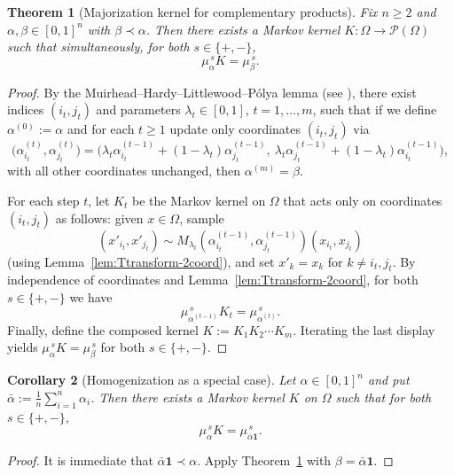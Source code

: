 \documentclass[11pt]{amsart}
\theoremstyle{plain}
\newtheorem{theorem}{Theorem}[section]
\newtheorem{corollary}[theorem]{Corollary}
\theoremstyle{definition}
\begin{document}
\begin{appendix}
\begin{theorem}[Majorization kernel for complementary products]
\label{thm:majorization-kernel}
Fix $n\ge2$ and $\alpha,\beta\in[0,1]^n$ with $\beta\prec\alpha$.
Then there exists a Markov kernel $K:\Omega\to\mathcal P(\Omega)$ such that
simultaneously, for both $s\in\{+,-\}$,
\[
\mu_{\alpha}^{\,s}K=\mu_{\beta}^{\,s}.
\]
\end{theorem}

\begin{proof}
By the Muirhead--Hardy--Littlewood--P\'olya lemma
(see \cite[Lemma~B.1]{marshall2011inequalities}),
there exist indices $(i_t,j_t)$ and parameters $\lambda_t\in[0,1]$, $t=1,\dots,m$,
such that if we define $\alpha^{(0)}:=\alpha$ and for each $t\ge1$ update only
coordinates $(i_t,j_t)$ via
\[
\bigl(\alpha^{(t)}_{i_t},\alpha^{(t)}_{j_t}\bigr)
=
\bigl(\lambda_t\alpha^{(t-1)}_{i_t}+(1-\lambda_t)\alpha^{(t-1)}_{j_t},\ 
\lambda_t\alpha^{(t-1)}_{j_t}+(1-\lambda_t)\alpha^{(t-1)}_{i_t}\bigr),
\]
with all other coordinates unchanged, then $\alpha^{(m)}=\beta$.

For each step $t$, let $K_t$ be the Markov kernel on $\Omega$ that acts only on
coordinates $(i_t,j_t)$ as follows: given $x\in\Omega$, sample
\[
(x'_{i_t},x'_{j_t})\sim M_{\lambda_t}\!\left(\alpha^{(t-1)}_{i_t},\alpha^{(t-1)}_{j_t}\right)(x_{i_t},x_{j_t})
\]
(using Lemma~\ref{lem:Ttransform-2coord}), and set $x'_k=x_k$ for $k\neq i_t,j_t$.
By independence of coordinates and Lemma~\ref{lem:Ttransform-2coord},
for both $s\in\{+,-\}$ we have
\[
\mu_{\alpha^{(t-1)}}^{\,s}K_t=\mu_{\alpha^{(t)}}^{\,s}.
\]
Finally, define the composed kernel $K:=K_1K_2\cdots K_m$. Iterating the last display yields
$\mu_{\alpha}^{\,s}K=\mu_{\beta}^{\,s}$ for both $s\in\{+,-\}$.
\end{proof}

\begin{corollary}[Homogenization as a special case]
\label{cor:homog-majorization}
Let $\alpha\in[0,1]^n$ and put $\bar\alpha:=\frac1n\sum_{i=1}^n \alpha_i$.
Then there exists a Markov kernel $K$ on $\Omega$ such that for both $s\in\{+,-\}$,
\[
\mu_{\alpha}^{\,s}K=\mu_{\bar\alpha\mathbf 1}^{\,s}.
\]
\end{corollary}

\begin{proof}
It is immediate that $\bar\alpha\mathbf 1 \prec \alpha$. Apply
Theorem~\ref{thm:majorization-kernel} with $\beta=\bar\alpha\mathbf 1$.
\end{proof}



\end{appendix}
\end{document}
